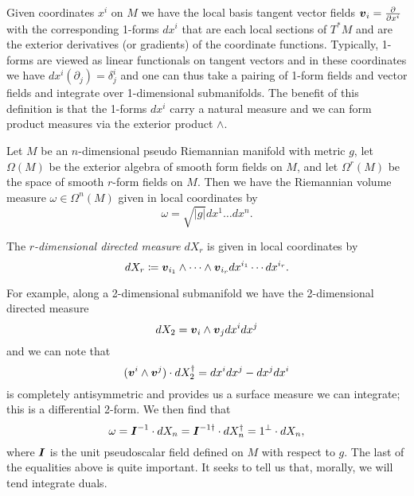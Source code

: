 Given coordinates $x^i$ on $M$ we have the local basis tangent vector fields $\boldsymbol{v}_i=\frac{\partial}{\partial x^i}$ with the corresponding 1-forms $dx^i$ that are each local sections of $T^*M$ and are the exterior derivatives (or gradients) of the coordinate functions.  Typically, 1-forms are viewed as linear functionals on tangent vectors and in these coordinates we have $dx^i  (\partial_j) = \delta^i_j$ and one can thus take a pairing of 1-form fields and vector fields and integrate over 1-dimensional submanifolds. The benefit of this definition is that the 1-forms $dx^i$ carry a natural measure and we can form product measures via the exterior product $\wedge$.

Let $M$ be an $n$-dimensional pseudo Riemannian manifold with metric $g$, let $\Omega(M)$ be the exterior algebra of smooth form fields on $M$, and let $\Omega^r(M)$ be the space of smooth $r$-form fields on $M$. Then we have the Riemannian volume measure $\omega \in \Omega^n(M)$ given in local coordinates by
\begin{equation}
\omega = \sqrt{|g|} dx^1\dots dx^n.
\end{equation}
\begin{definition}
The \emph{$r$-dimensional directed measure} $dX_r$ is given in local coordinates by
\begin{equation}
    dX_r \coloneqq \boldsymbol{v}_{i_1} \wedge \cdots \wedge \boldsymbol{v}_{i_r} dx^{i_1} \cdots dx^{i_r}. 
\end{equation}
\end{definition}
For example, along a 2-dimensional submanifold we have the 2-dimensional directed measure 
\begin{equation}
    dX_2 = \boldsymbol{v}_i \wedge \boldsymbol{v}_j dx^i dx^j
\end{equation}
and we can note that 
\begin{equation}
(\boldsymbol{v}^i \wedge \boldsymbol{v}^j)\cdot dX_2^\dagger = dx^idx^j - dx^j dx^i
\end{equation}
is completely antisymmetric and provides us a surface measure we can integrate; this is a differential 2-form. We then find that
\begin{equation}
\label{eq:volume_form}
\omega = \boldsymbol{I}^{-1} \cdot dX_n = \boldsymbol{I}^{-1 \dagger} \cdot dX_n^\dagger = 1^\perp \cdot dX_n,
\end{equation}
where $\boldsymbol{I}$ is the unit pseudoscalar field defined on $M$ with respect to $g$. The last of the equalities above is quite important. It seeks to tell us that, morally, we will tend integrate duals.

